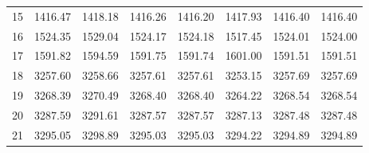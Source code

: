 \documentclass[10pt,oneside]{article}
\begin{document}
\begin{table}[h!]
\begin{tabular}{cccccccc}
15 &   1416.47 & 1418.18 & 1416.26 &    1416.20 &      1417.93 & 1416.40 &   1416.40 \\
16 &   1524.35 & 1529.04 & 1524.17 &    1524.18 &      1517.45 & 1524.01 &   1524.00 \\
17 &   1591.82 & 1594.59 & 1591.75 &    1591.74 &      1601.00 & 1591.51 &   1591.51 \\
18 &   3257.60 & 3258.66 & 3257.61 &    3257.61 &      3253.15 & 3257.69 &   3257.69 \\
19 &   3268.39 & 3270.49 & 3268.40 &    3268.40 &      3264.22 & 3268.54 &   3268.54 \\
20 &   3287.59 & 3291.61 & 3287.57 &    3287.57 &      3287.13 & 3287.48 &   3287.48 \\
21 &   3295.05 & 3298.89 & 3295.03 &    3295.03 &      3294.22 & 3294.89 &   3294.89 \\
\bottomrule
\end{tabular}
\end{table}
\end{document}
